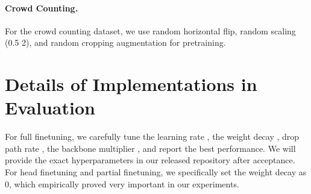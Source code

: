 \documentclass[10pt,twocolumn,letterpaper]{article}
\begin{document}
\paragraph{Crowd Counting.}
For the crowd counting dataset, we use random horizontal flip, random scaling (0.5  2), and random cropping augmentation for pretraining.


\section{Details of Implementations in Evaluation}
For full finetuning, we carefully tune the learning rate , the weight decay , drop path rate , the backbone multiplier , and report the best performance. We will provide the exact hyperparameters in our released repository after acceptance. For head finetuning and partial finetuning, we specifically set the weight decay as 0, which empirically proved very important in our experiments.
\end{document}
